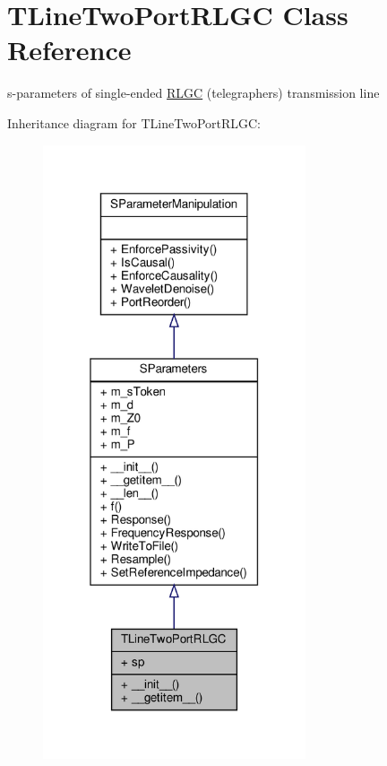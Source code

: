\hypertarget{classSignalIntegrity_1_1SParameters_1_1Devices_1_1TLineTwoPortRLGC_1_1TLineTwoPortRLGC}{}\section{T\+Line\+Two\+Port\+R\+L\+GC Class Reference}
\label{classSignalIntegrity_1_1SParameters_1_1Devices_1_1TLineTwoPortRLGC_1_1TLineTwoPortRLGC}


s-\/parameters of single-\/ended \hyperlink{namespaceSignalIntegrity_1_1SParameters_1_1RLGC}{R\+L\+GC} (telegraphers) transmission line  




Inheritance diagram for T\+Line\+Two\+Port\+R\+L\+GC\+:\nopagebreak
\begin{figure}[H]
\begin{center}
\leavevmode
\includegraphics[width=220pt]{classSignalIntegrity_1_1SParameters_1_1Devices_1_1TLineTwoPortRLGC_1_1TLineTwoPortRLGC__inherit__graph}
\end{center}
\end{figure}


